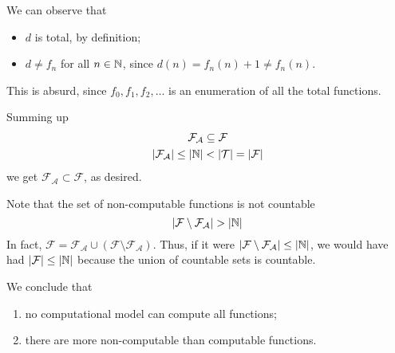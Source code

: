 We can observe that
\begin{itemize}
\item $d$ is total, by definition;
\item $d \neq f_n$ for all $n \in \mathbb{N}$, since $d(n) = f_n(n)+1 \neq f_n(n)$.
\end{itemize}
This is absurd, since $f_0, f_1, f_2, \ldots$ is an enumeration of all the total functions.

\medskip

Summing up
\begin{gather*}
  \mathcal{F}_\mathcal{A} \subseteq \mathcal{F}\\
  |\mathcal{F}_\mathcal{A}| \leq |\mathbb{N}| < |\mathcal{T}| = |\mathcal{F}|
\end{gather*}
we get $\mathcal{F}_\mathcal{A} \subset \mathcal{F}$, as desired.

Note that the set of non-computable functions is not countable
\begin{equation*}
  |\mathcal{F} \setminus \mathcal{F}_{\mathcal{A}}| > |\mathbb{N}|
\end{equation*}
In fact, $\mathcal{F} = \mathcal{F}_{\mathcal{A}} \cup (\mathcal{F} \setminus \mathcal{F}_{\mathcal{A}})$. 
Thus, if it were $|\mathcal{F} \setminus \mathcal{F}_{\mathcal{A}}| \leq |\mathbb{N}|$, we would have had $|\mathcal{F}| \leq |\mathbb{N}|$ because the union of countable sets is countable.

We conclude that
\begin{enumerate}
\item no computational model can compute all functions;
\item there are more non-computable than computable functions.
\end{enumerate}
